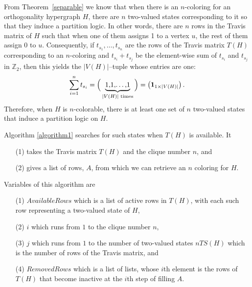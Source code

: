 \documentclass[%
12pt,
prereprint,
showpacs,
showkeys,
preprintnumbers,
amsmath,amssymb,
aps,
pra,
longbibliography,
notitlepage
]{revtex4-1}
\theoremstyle{definition}
\begin{document}
        From Theorem~\ref{separable} we know that when there is an $n$-coloring for an orthogonality hypergraph $H$, there are $n$ two-valued states corresponding to it so that they induce a partition logic. In other words, there are $n$ rows in the Travis matrix of $H$ such that when one of them assigns 1 to a vertex $u$, the rest of them assign 0 to $u$. Consequently, if $t_{s_1},\ldots,t_{s_n}$ are the rows of the Travis matrix $T(H)$ corresponding to an $n$-coloring and $t_{s_i} + t_{s_j}$ be the element-wise sum of $t_{s_i}$ and $t_{s_j}$ in $\mathbb{Z}_2$, then this yields the $\vert V(H)\vert$--tuple whose entries are one:
                \begin{equation}\label{color-all-two-states}
                \sum_{i=1}^{n} t_{s_i} = \Big(\underbrace{\raisebox{-0pt}{1,1,\ldots,1}}_{\vert V(H)\vert \text{ times}}\Big)=\begin{pmatrix}\mathbf{1}_{1\times \vert V(H)\vert}\end{pmatrix}.
        \end{equation}
        Therefore, when $H$ is $n$-colorable, there is at least one set of $n$ two-valued states that induce a partition logic on $H$.

        Algorithm \ref{algorithm1} searches for such states when $T(H)$ is available. It
        \begin{enumerate}
            \item[(1)] takes the Travis matrix $T(H)$ and the clique number $n$, and
            \item[(2)] gives a list of rows, $A$, from which we can retrieve an $n$ coloring for $H$.
        \end{enumerate}

        Variables of this algorithm are
        \begin{enumerate}
            \item[(1)] $AvailableRows$ which is a list of active rows in $T(H)$, with each such row representing a two-valued state of $H$,
            \item[(2)] $i$ which runs from $1$ to the clique number $n$,
            \item[(3)] $j$ which runs from $1$ to the number of two-valued states $nTS(H)$ which is the number of rows of the Travis matrix, and
            \item[(4)] $RemovedRows$ which is a list of lists, whose $i$th element is the rows of $T(H)$ that become inactive at the $i$th step of filling $A$.
        \end{enumerate}
\end{document}
